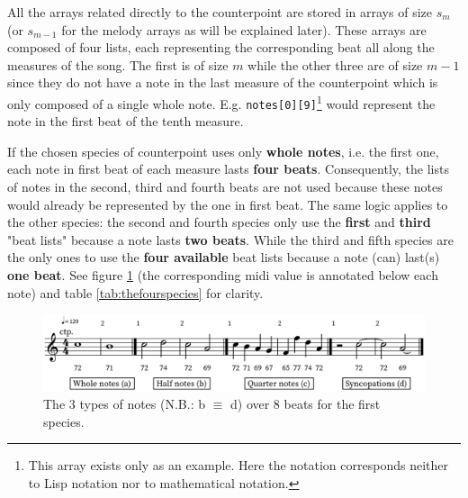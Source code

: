 All the arrays related directly to the counterpoint are stored in arrays of size $s_{m}$ (or $s_{m-1}$ for the melody arrays as will be explained later). These arrays are composed of four lists, each representing the corresponding beat all along the measures of the song. The first is of size $m$ while the other three are of size $m-1$ since they do not have a note in the last measure of the counterpoint which is only composed of a single whole note. E.g. \texttt{notes[0][9]}\footnote{This array exists only as an example. Here the notation corresponds neither to Lisp notation nor to mathematical notation.} would represent the note in the first beat of the tenth measure.

If the chosen species of counterpoint uses only \textbf{whole notes}, i.e. the first one, each note in first beat of each measure lasts \textbf{four beats}. Consequently, the lists of notes in the second, third and fourth beats are not used because these notes would already be represented by the one in first beat. The same logic applies to the other species: the second and fourth species only use the \textbf{first} and \textbf{third} "beat lists" because a note lasts \textbf{two beats}. While the third and fifth species are the only ones to use the \textbf{four available} beat lists because a note (can) last(s) \textbf{one beat}. See figure \ref{fig:thefourspecies} (the corresponding midi value is annotated below each note) and table \ref{tab:thefourspecies} for clarity.
\begin{figure}[h]
    \centering
    \includegraphics[width=\textwidth]{Images/the_four_species.png}
    \caption{The 3 types of notes (N.B.: b $\equiv$ d) over 8 beats for the  first species.}
    \label{fig:thefourspecies}
\end{figure}

